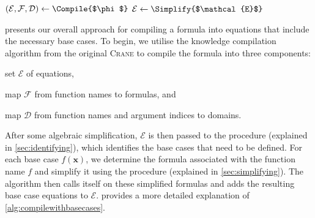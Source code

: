 \documentclass[letterpaper]{article} %
\theoremstyle{remark}
\theoremstyle{definition}
\begin{document}
\begin{algorithm}[t]
  \caption{\protect\CompileWithBaseCases{$\phi$}}\label{alg:compilewithbasecases}
  $(\mathcal{E}, \mathcal{F}, \mathcal{D}) \gets \Compile{$\phi$}$\;\label{line:first}
  $\mathcal{E} \gets \Simplify{$\mathcal{E}$}$\;\label{line:second}
\end{algorithm}

 presents our overall approach for compiling a
formula into equations that include the necessary base cases. To begin, we
utilise the knowledge compilation algorithm from the original \textsc{Crane} to
compile the formula into three components:
\begin{enumerate*}[label=(\roman*)]
  \item set $\mathcal{E}$ of equations,
  \item map $\mathcal{F}$ from function names to formulas, and
  \item map $\mathcal{D}$ from function names and argument indices to domains.
\end{enumerate*}
After some algebraic simplification, $\mathcal{E}$ is then passed to the
\FindBaseCases procedure (explained in \cref{sec:identifying}), which identifies
the base cases that need to be defined. For each base case $f(\mathbf{x})$, we
determine the formula associated with the function name $f$ and simplify it
using the \Propagate procedure (explained in \cref{sec:simplifying}). The
algorithm then calls itself on these simplified formulas and adds the resulting
base case equations to $\mathcal{E}$.  provides a more
detailed explanation of \cref{alg:compilewithbasecases}.
\end{document}
